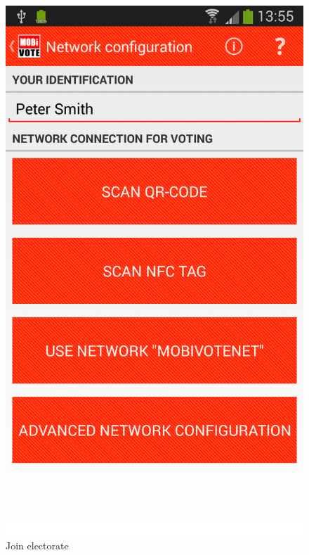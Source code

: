 \documentclass[numbers=noenddot, abstract=on, a4paper, headsepline,
footsepline, oneside, openright, draft=off, listof=leveldown]{scrreprt}
\begin{document}
\begin{figure}[!htb]
	\begin{minipage}{.5\textwidth}
  		\centering
		\includegraphics[height=.4\textheight]{img/screenshots/join_electorate}
		\caption{Join electorate}
		\label{fig:handbook_joinelectorate}
	\end{minipage}
	\begin{minipage}{.5\textwidth}
  		\centering

\end{minipage}
\end{figure}
\end{document}
